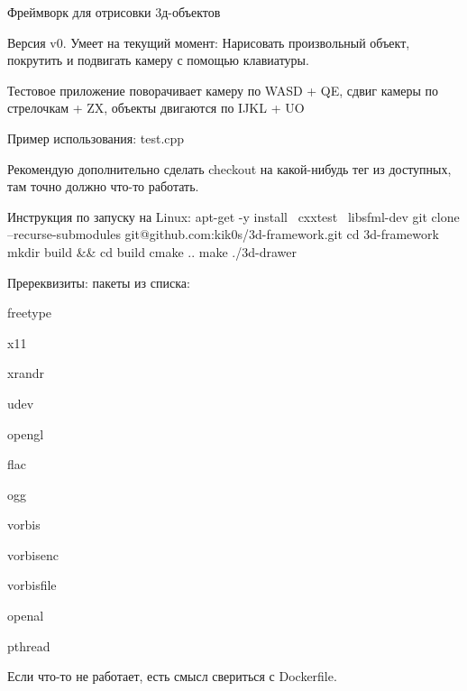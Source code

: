 Фреймворк для отрисовки 3д-\/объектов

Версия v0. Умеет на текущий момент\+: Нарисовать произвольный объект, покрутить и подвигать камеру с помощью клавиатуры.

Тестовое приложение поворачивает камеру по W\+A\+SD + QE, сдвиг камеры по стрелочкам + ZX, объекты двигаются по I\+J\+KL + UO

Пример использования\+: test.\+cpp

 

Рекомендую дополнительно сделать checkout на какой-\/нибудь тег из доступных, там точно должно что-\/то работать. \begin{DoxyVerb}            Инструкция по запуску на Linux:
            apt-get -y install \
                        cxxtest \
                        libsfml-dev
             git clone --recurse-submodules git@github.com:kik0s/3d-framework.git
             cd 3d-framework
             mkdir build && cd build
             cmake ..
             make
             ./3d-drawer
\end{DoxyVerb}


Пререквизиты\+: пакеты из списка\+:


\begin{DoxyItemize}
\item freetype 
\item x11 
\item xrandr 
\item udev 
\item opengl 
\item flac 
\item ogg 
\item vorbis 
\item vorbisenc 
\item vorbisfile 
\item openal 
\item pthread 
\end{DoxyItemize}

Если что-\/то не работает, есть смысл свериться с Dockerfile. 